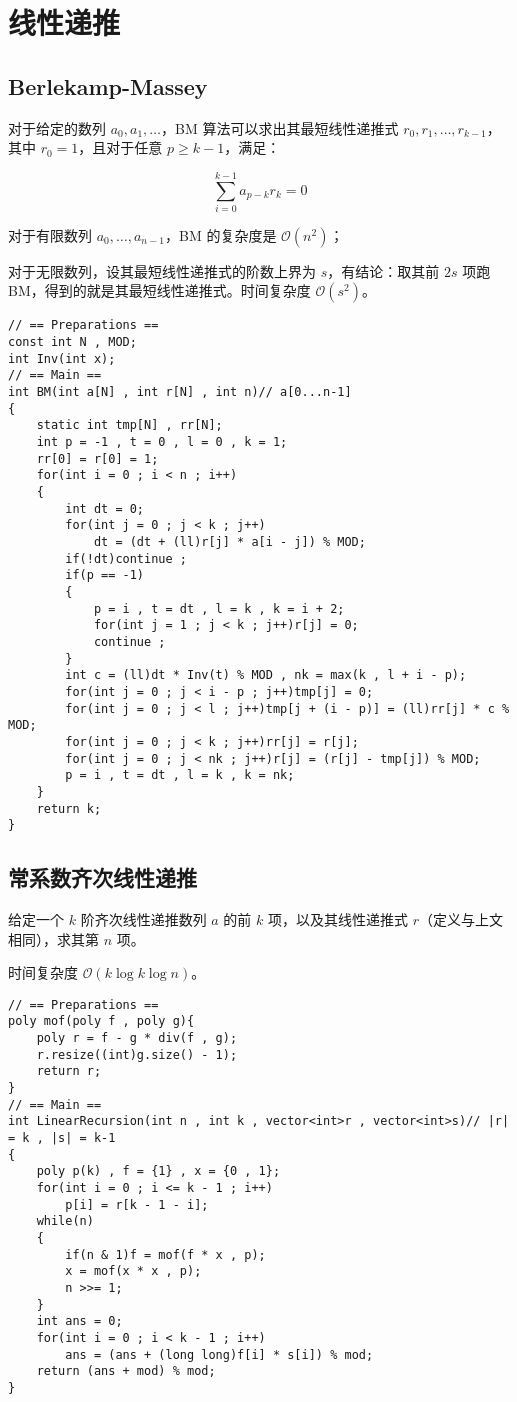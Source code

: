 \section{线性递推}

\subsection{Berlekamp-Massey}

对于给定的数列 $a_0,a_1,\dots$，BM 算法可以求出其最短线性递推式 $r_{0},r_{1},\dots,r_{k-1}$，其中 $r_0=1$，且对于任意 $p\ge k-1$，满足：

$$
\sum\limits_{i=0}^{k-1} a_{p-k}r_{k} = 0
$$

对于有限数列 $a_0,\dots,a_{n-1}$，BM 的复杂度是 $\mathcal{O}(n^2)$；

对于无限数列，设其最短线性递推式的阶数上界为 $s$，有结论：取其前 $2s$ 项跑 BM，得到的就是其最短线性递推式。时间复杂度 $\mathcal{O}(s^2)$。

\begin{verbatim}
// == Preparations ==
const int N , MOD;
int Inv(int x);
// == Main ==
int BM(int a[N] , int r[N] , int n)// a[0...n-1]
{
    static int tmp[N] , rr[N];
    int p = -1 , t = 0 , l = 0 , k = 1; 
    rr[0] = r[0] = 1;
    for(int i = 0 ; i < n ; i++)
    {
        int dt = 0;
        for(int j = 0 ; j < k ; j++)
            dt = (dt + (ll)r[j] * a[i - j]) % MOD;
        if(!dt)continue ;
        if(p == -1)
        {
            p = i , t = dt , l = k , k = i + 2;
            for(int j = 1 ; j < k ; j++)r[j] = 0;
            continue ;
        }
        int c = (ll)dt * Inv(t) % MOD , nk = max(k , l + i - p);
        for(int j = 0 ; j < i - p ; j++)tmp[j] = 0;
        for(int j = 0 ; j < l ; j++)tmp[j + (i - p)] = (ll)rr[j] * c % MOD;
        for(int j = 0 ; j < k ; j++)rr[j] = r[j];
        for(int j = 0 ; j < nk ; j++)r[j] = (r[j] - tmp[j]) % MOD;
        p = i , t = dt , l = k , k = nk;
    }
    return k;
}
\end{verbatim}

\subsection{常系数齐次线性递推}

给定一个 $k$ 阶齐次线性递推数列 $a$ 的前 $k$ 项，以及其线性递推式 $r$（定义与上文相同），求其第 $n$ 项。

时间复杂度 $\mathcal{O}(k \log k \log n)$。

\begin{verbatim}
// == Preparations ==
poly mof(poly f , poly g){
    poly r = f - g * div(f , g);
    r.resize((int)g.size() - 1);
    return r;
}
// == Main ==
int LinearRecursion(int n , int k , vector<int>r , vector<int>s)// |r| = k , |s| = k-1
{
    poly p(k) , f = {1} , x = {0 , 1};
    for(int i = 0 ; i <= k - 1 ; i++)
        p[i] = r[k - 1 - i];
    while(n)
    {
        if(n & 1)f = mof(f * x , p);
        x = mof(x * x , p);
        n >>= 1;
    }
    int ans = 0;
    for(int i = 0 ; i < k - 1 ; i++)
        ans = (ans + (long long)f[i] * s[i]) % mod;
    return (ans + mod) % mod;
}
\end{verbatim}